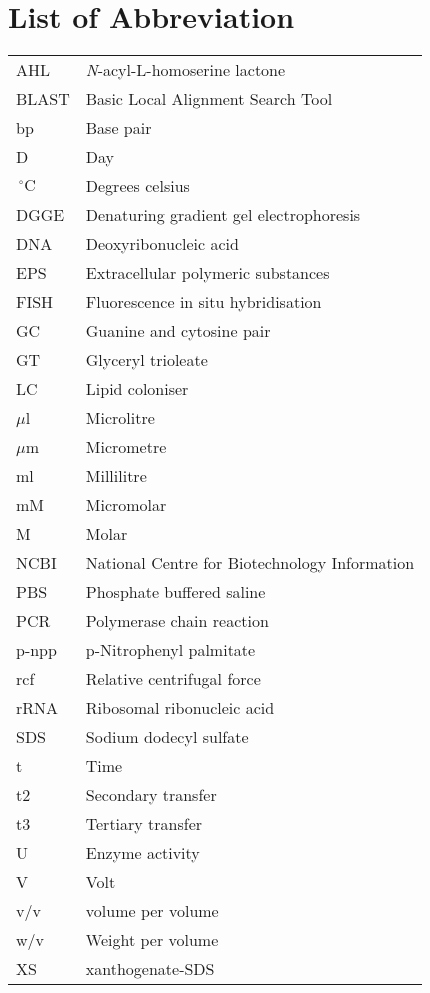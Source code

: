 \documentclass[twoside]{article}
\begin{document}
\section{List of Abbreviation}
\thispagestyle{plain}
\begin{tabularx}{\textwidth}{ p{4cm} | p{8cm} }
\hline
AHL & \emph{N}-acyl-L-homoserine lactone \\
BLAST & Basic Local Alignment Search Tool  \\
bp & Base pair \\
D & Day \\
$\,^{\circ}\mathrm{C}$ & Degrees celsius \\
DGGE & Denaturing gradient gel electrophoresis \\
DNA & Deoxyribonucleic acid  \\
 EPS & Extracellular polymeric substances \\
FISH & Fluorescence in situ hybridisation \\
 GC & Guanine and cytosine pair \\
GT & Glyceryl trioleate \\
LC & Lipid coloniser \\
$\mu$l & Microlitre \\
$\mu$m & Micrometre \\
ml & Millilitre \\
mM & Micromolar \\
M & Molar \\
NCBI &  National Centre for Biotechnology Information \\
PBS & Phosphate buffered saline \\
PCR & Polymerase chain reaction \\
 p-npp & p-Nitrophenyl palmitate \\
rcf & Relative centrifugal force \\
rRNA & Ribosomal ribonucleic acid \\
SDS & Sodium dodecyl sulfate \\
t & Time \\
 t2 & Secondary transfer \\
t3 & Tertiary transfer \\
U & Enzyme activity \\
V & Volt \\
v/v & volume per volume \\
w/v & Weight per volume \\
XS & xanthogenate-SDS \\
  \hline
\end{tabularx}
\end{document}
